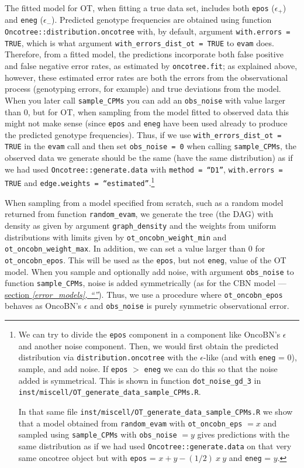 \documentclass[a4paper,11pt]{article}
\newcommand*{\qrefS}[1]{\hyperref[{#1}]{section \textit{\ref*{#1},
      ``\nameref*{#1}''}}}
\begin{document}
The fitted model for OT, when fitting a true data set, includes both \texttt{epos} ($\epsilon_+$) and \texttt{eneg} ($\epsilon_-$). Predicted genotype frequencies are obtained using function \texttt{Oncotree::distribution.oncotree} with, by default, argument \texttt{with.errors = TRUE}, which is what argument \texttt{with\_errors\_dist\_ot = TRUE} to \texttt{evam} does. Therefore, from a fitted model, the predictions incorporate both false positive and false negative error rates, as estimated by \texttt{oncotree.fit}; as explained above, however, these estimated error rates are both the errors from the observational process (genotyping errors, for example) and true deviations from the model. When you later call \texttt{sample\_CPMs} you can add an \texttt{obs\_noise} with value larger than 0, but for OT, when sampling from the model fitted to observed data this might not make sense (since \texttt{epos} and \texttt{eneg} have been used already to produce the predicted genotype frequencies). Thus, if we use \texttt{with\_errors\_dist\_ot = TRUE} in the \texttt{evam} call and then set \texttt{obs\_noise = 0} when calling \texttt{sample\_CPMs}, the observed data we generate should be the same (have the same distribution) as if we had used \texttt{Oncotree::generate.data} with \texttt{method = ``D1''}, \texttt{with.errors = TRUE} and \texttt{edge.weights = ``estimated''}.\footnote{
  We can try to divide the \texttt{epos} component in a component like OncoBN's $\epsilon$ and another noise component. Then, we would first obtain the predicted distribution via \texttt{distribution.oncotree} with the $\epsilon$-like (and with \texttt{eneg} = 0), sample, and add noise. If \texttt{epos} $>$ \texttt{eneg} we can do this so that the noise added is symmetrical. This is shown in function \texttt{dot\_noise\_gd\_3} in \texttt{inst/miscell/OT\_generate\_data\_sample\_CPMs.R}.

  
In that same file \texttt{inst/miscell/OT\_generate\_data\_sample\_CPMs.R} we show that a model obtained from \texttt{random\_evam} with \texttt{ot\_oncobn\_eps}  $= x$ and sampled using \texttt{sample\_CPMs} with \texttt{obs\_noise} $= y$ gives predictions with the same distribution as if we had used \texttt{Oncotree::generate.data} on that very same oncotree object but with \texttt{epos} = $x + y - (1/2)\ x\ y$ and \texttt{eneg} = $y$.}



When sampling from a model specified from scratch, such as a random model returned from function \texttt{random\_evam},  we generate the tree (the DAG) with density as given by argument \texttt{graph\_density} and the weights from uniform distributions with limits  given by \texttt{ot\_oncobn\_weight\_min} and \texttt{ot\_oncobn\_weight\_max}. In addition, we can set a value larger than 0 for \texttt{ot\_oncobn\_epos}. This will be used as the \texttt{epos}, but not \texttt{eneg}, value of the OT model. When you sample and optionally add noise, with argument \texttt{obs\_noise} to function \texttt{sample\_CPMs}, noise is added symmetrically (as for the CBN model ---\qrefS{error_models}). Thus, we use a procedure where \texttt{ot\_oncobn\_epos} behaves as OncoBN's $\epsilon$ and \texttt{obs\_noise} is purely symmetric observational error.
\end{document}
